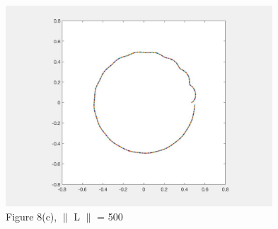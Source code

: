 \documentclass[12pt]{article}
\renewcommand{\(}{\left (}
\renewcommand{\)}{\right )}
\begin{document}
\begin{figure}[ht]
	\begin{minipage}{0.33\textwidth}
		\centering
		\includegraphics[width=0.89\textwidth]{even_L500.jpg}
		\caption*{\small Figure 8(c), $\parallel$ L $\parallel$ = 500}
	\end{minipage}
\end{figure}
\end{document}
